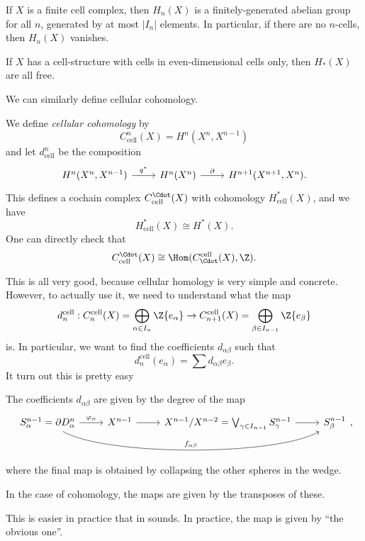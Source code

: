 \documentclass[a4paper]{article}
\begin{document}
\begin{cor}
  If $X$ is a finite cell complex, then $H_n(X)$ is a finitely-generated abelian group for all $n$, generated by at most $|I_n|$ elements. In particular, if there are no $n$-cells, then $H_n(X)$ vanishes.

  If $X$ has a cell-structure with cells in even-dimensional cells only, then $H_*(X)$ are all free.
\end{cor}

We can similarly define cellular cohomology.
\begin{defi}
  We define \emph{cellular cohomology} by
  \[
    C_{\mathrm{cell}}^n(X) = H^n(X^n, X^{n - 1})
  \]
  and let $d_{\mathrm{cell}}^n$ be the composition
  \[
    \begin{tikzcd}
      H^n(X^n, X^{n - 1}) \ar[r, "q^*"] & H^n(X^n) \ar[r, "\partial"] & H^{n + 1}(X^{n + 1}, X^n).
    \end{tikzcd}
  \]
  This defines a cochain complex $C_{\mathrm{cell}}^\Cdot(X)$ with cohomology $H^*_{\mathrm{cell}}(X)$, and we have
  \[
    H_{\mathrm{cell}}^*(X) \cong H^*(X).
  \]
  One can directly check that
  \[
    C_{\mathrm{cell}}^\Cdot(X) \cong \Hom (C_\Cdot^{\mathrm{cell}}(X), \Z).
  \]
\end{defi}

This is all very good, because cellular homology is very simple and concrete. However, to actually use it, we need to understand what the map
\[
  d_n^{\mathrm{cell}} : C_n^{\mathrm{cell}}(X) = \bigoplus_{\alpha \in I_n} \Z\{e_\alpha\} \to C_{n + 1}^{\mathrm{cell}}(X) = \bigoplus_{\beta \in I_{n - 1}}\Z\{e_\beta\}
\]
is. In particular, we want to find the coefficients $d_{\alpha\beta}$ such that
\[
  d_n^{\mathrm{cell}}(e_\alpha) = \sum d_{\alpha\beta} e_\beta.
\]
It turn out this is pretty easy
\begin{lemma}
  The coefficients $d_{\alpha\beta}$ are given by the degree of the map
  \[
    \begin{tikzcd}
      S_\alpha^{n - 1} = \partial D_\alpha^n \ar[r, "\varphi_\alpha"] \ar[rrr, bend right, "f_{\alpha\beta}", looseness=0.5] & X^{n - 1} \ar[r] & X^{n - 1}/X^{n - 2} = \bigvee_{\gamma \in I_{n - 1}} S_\gamma^{n - 1} \ar[r] & S_\beta^{n - 1}
    \end{tikzcd},
  \]
  where the final map is obtained by collapsing the other spheres in the wedge.

  In the case of cohomology, the maps are given by the transposes of these.
\end{lemma}
This is easier in practice that in sounds. In practice, the map is given by ``the obvious one''.
\end{document}
